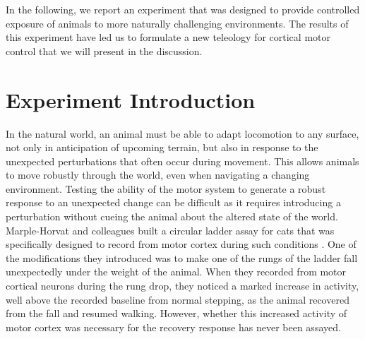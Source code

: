 In the following, we report an experiment that was designed to provide controlled exposure of animals to more naturally challenging environments. The results of this experiment have led us to formulate a new teleology for cortical motor control that we will present in the discussion.

\section{Experiment Introduction}

In the natural world, an animal must be able to adapt locomotion to any surface, not only in anticipation of upcoming terrain, but also in response to the unexpected perturbations that often occur during movement. This allows animals to move robustly through the world, even when navigating a changing environment. Testing the ability of the motor system to generate a robust response to an unexpected change can be difficult as it requires introducing a perturbation without cueing the animal about the altered state of the world. Marple-Horvat and colleagues built a circular ladder assay for cats that was specifically designed to record from motor cortex during such conditions \cite{Marple-Horvat1993}. One of the modifications they introduced was to make one of the rungs of the ladder fall unexpectedly under the weight of the animal. When they recorded from motor cortical neurons during the rung drop, they noticed a marked increase in activity, well above the recorded baseline from normal stepping, as the animal recovered from the fall and resumed walking. However, whether this increased activity of motor cortex was necessary for the recovery response has never been assayed.
